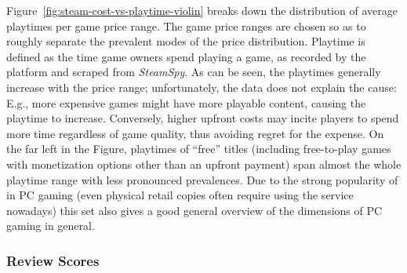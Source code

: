Figure~\ref{fig:steam-cost-vs-playtime-violin} breaks down the
distribution of average playtimes per game price range. The game price
ranges are chosen so as to roughly separate the prevalent modes of the
price distribution.
Playtime is defined as the time game owners spend playing a game, as
recorded by the \steam platform and scraped from \textit{SteamSpy}. As
can be seen, the playtimes generally increase with the price range;
unfortunately, the data does not explain the cause: E.g., more expensive
games might have more playable content, causing the playtime to
increase. Conversely, higher upfront costs may incite players to spend
more time regardless of game quality, thus avoiding regret for the
expense. On the far left in the Figure, playtimes of ``free'' titles
(including free-to-play games with monetization options other than an
upfront payment) span almost the whole playtime range with less
pronounced prevalences.
Due to the strong popularity of \steam in PC gaming (even physical
retail copies often require using the service nowadays) this set also
gives a good general overview of the dimensions of PC gaming in general.


\subsubsection{Review Scores}

